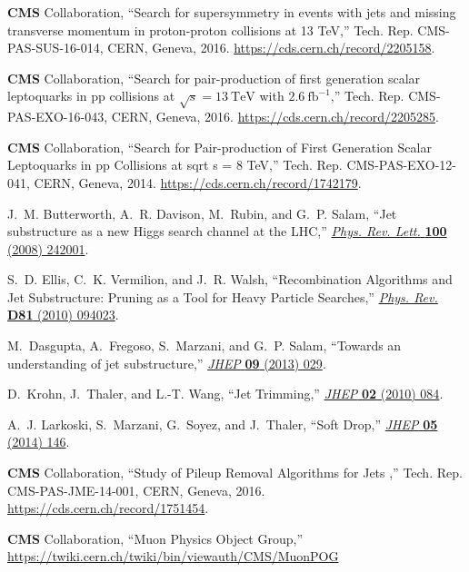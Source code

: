 \begin{thebibliography}{99}
{\bfseries CMS} Collaboration, ``{Search for supersymmetry in events with jets
  and missing transverse momentum in proton-proton collisions at 13 TeV},''
  Tech. Rep. CMS-PAS-SUS-16-014, CERN, Geneva, 2016.
\newblock \url{https://cds.cern.ch/record/2205158}.

{\bfseries CMS} Collaboration, ``{Search for pair-production of first
  generation scalar leptoquarks in pp collisions at $\sqrt{s}=13~\mathrm{TeV}$
  with $2.6~\mathrm{fb}^{-1}$},'' Tech. Rep. CMS-PAS-EXO-16-043, CERN, Geneva,
  2016.
\newblock \url{https://cds.cern.ch/record/2205285}.

{\bfseries CMS} Collaboration, ``{Search for Pair-production of First
  Generation Scalar Leptoquarks in pp Collisions at sqrt s = 8 TeV},'' Tech.
  Rep. CMS-PAS-EXO-12-041, CERN, Geneva, 2014.
\newblock \url{https://cds.cern.ch/record/1742179}.

J.~M. Butterworth, A.~R. Davison, M.~Rubin, and G.~P. Salam, ``{Jet
  substructure as a new Higgs search channel at the LHC},''
  \href{http://dx.doi.org/10.1103/PhysRevLett.100.242001}{{\em Phys. Rev.
  Lett.} {\bfseries 100} (2008) 242001}.

S.~D. Ellis, C.~K. Vermilion, and J.~R. Walsh, ``{Recombination Algorithms and
  Jet Substructure: Pruning as a Tool for Heavy Particle Searches},''
  \href{http://dx.doi.org/10.1103/PhysRevD.81.094023}{{\em Phys. Rev.}
  {\bfseries D81} (2010) 094023}.

M.~Dasgupta, A.~Fregoso, S.~Marzani, and G.~P. Salam, ``{Towards an
  understanding of jet substructure},''
  \href{http://dx.doi.org/10.1007/JHEP09(2013)029}{{\em JHEP} {\bfseries 09}
  (2013) 029}.

D.~Krohn, J.~Thaler, and L.-T. Wang, ``{Jet Trimming},''
  \href{http://dx.doi.org/10.1007/JHEP02(2010)084}{{\em JHEP} {\bfseries 02}
  (2010) 084}.

A.~J. Larkoski, S.~Marzani, G.~Soyez, and J.~Thaler, ``{Soft Drop},''
  \href{http://dx.doi.org/10.1007/JHEP05(2014)146}{{\em JHEP} {\bfseries 05}
  (2014) 146}.

{\bfseries CMS} Collaboration, ``{Study of Pileup Removal Algorithms for Jets
  },'' Tech. Rep. CMS-PAS-JME-14-001, CERN, Geneva, 2016.
\newblock \url{https://cds.cern.ch/record/1751454}.


{\bfseries CMS} Collaboration, ``{Muon Physics Object Group},''
\newblock \url{https://twiki.cern.ch/twiki/bin/viewauth/CMS/MuonPOG}



\end{thebibliography}
